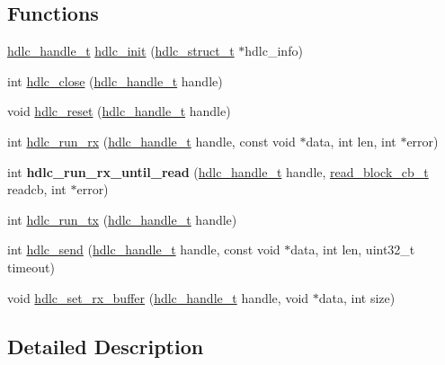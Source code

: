\subsection*{Functions}
\begin{DoxyCompactItemize}
\item 
\hyperlink{struct__hdlc__handle__t}{hdlc\+\_\+handle\+\_\+t} \hyperlink{group__HDLC__API_gaa41c388433273a76460ddfbaff0f8f5d}{hdlc\+\_\+init} (\hyperlink{group__HDLC__API_ga4537a8665b2abe023cb7fe40ea1bd024}{hdlc\+\_\+struct\+\_\+t} $\ast$hdlc\+\_\+info)
\item 
int \hyperlink{group__HDLC__API_ga21d727583f0f4534c8e4688eafcec66f}{hdlc\+\_\+close} (\hyperlink{struct__hdlc__handle__t}{hdlc\+\_\+handle\+\_\+t} handle)
\item 
void \hyperlink{group__HDLC__API_ga532836280097de1c8881df8336f21075}{hdlc\+\_\+reset} (\hyperlink{struct__hdlc__handle__t}{hdlc\+\_\+handle\+\_\+t} handle)
\item 
int \hyperlink{group__HDLC__API_ga911a3f1cb32dd6cadd00223e0097642c}{hdlc\+\_\+run\+\_\+rx} (\hyperlink{struct__hdlc__handle__t}{hdlc\+\_\+handle\+\_\+t} handle, const void $\ast$data, int len, int $\ast$error)
\item 
\mbox{\label{group__HDLC__API_ga196e57dcf71cd8910f756181f1f86871}} 
int {\bfseries hdlc\+\_\+run\+\_\+rx\+\_\+until\+\_\+read} (\hyperlink{struct__hdlc__handle__t}{hdlc\+\_\+handle\+\_\+t} handle, \hyperlink{tiny__types_8h_a15bec127d9ee63658563d62e92b5261b}{read\+\_\+block\+\_\+cb\+\_\+t} readcb, int $\ast$error)
\item 
int \hyperlink{group__HDLC__API_gae31d921043b4f175603114c206b6b829}{hdlc\+\_\+run\+\_\+tx} (\hyperlink{struct__hdlc__handle__t}{hdlc\+\_\+handle\+\_\+t} handle)
\item 
int \hyperlink{group__HDLC__API_ga8b5cc456927145cebd82b2b560a6fa10}{hdlc\+\_\+send} (\hyperlink{struct__hdlc__handle__t}{hdlc\+\_\+handle\+\_\+t} handle, const void $\ast$data, int len, uint32\+\_\+t timeout)
\item 
void \hyperlink{group__HDLC__API_ga73156f5cc3e59c3abb880d124de78f91}{hdlc\+\_\+set\+\_\+rx\+\_\+buffer} (\hyperlink{struct__hdlc__handle__t}{hdlc\+\_\+handle\+\_\+t} handle, void $\ast$data, int size)
\end{DoxyCompactItemize}


\subsection{Detailed Description}



